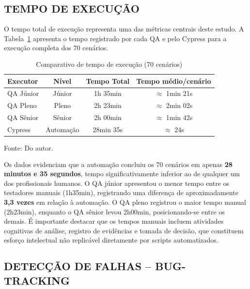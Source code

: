 \documentclass{UNESC}
\begin{document}
\subsection{TEMPO DE EXECUÇÃO}

O tempo total de execução representa uma das métricas centrais deste estudo. A Tabela~\ref{tab:tempo} apresenta o tempo registrado por cada QA e pelo Cypress para a execução completa dos 70 cenários.

\begin{table}[H]
\captionsetup{skip=2pt, singlelinecheck=false, justification=centering}
\caption{Comparativo de tempo de execução (70 cenários)}
\label{tab:tempo}
\renewcommand{\arraystretch}{1.0}
\setlength{\extrarowheight}{4pt}
\setlength{\tabcolsep}{6pt}
\begin{tabularx}{\textwidth}{X c c c}
\hline
\textbf{Executor} & \textbf{Nível} & \textbf{Tempo Total} & \textbf{Tempo médio/cenário} \\
\hline
QA Júnior & Júnior & 1h 35min & $\approx$ 1min 21s \\
QA Pleno  & Pleno  & 2h 23min & $\approx$ 2min 02s \\
QA Sênior & Sênior & 2h 00min & $\approx$ 1min 42s \\
Cypress   & Automação & 28min 35s & $\approx$ 24s \\
\hline
\end{tabularx}
\vspace{2mm}\par
\noindent Fonte: Do autor.
\end{table}

Os dados evidenciam que a automação concluiu os 70 cenários em apenas \textbf{28 minutos e 35 segundos}, tempo significativamente inferior ao de qualquer um dos profissionais humanos. O QA júnior apresentou o menor tempo entre os testadores manuais (1h35min), registrando uma diferença de aproximadamente \textbf{3,3 vezes} em relação à automação. O QA pleno registrou o maior tempo manual (2h23min), enquanto o QA sênior levou 2h00min, posicionando-se entre os demais. É importante destacar que os tempos manuais incluem atividades cognitivas de análise, registro de evidências e tomada de decisão, que constituem esforço intelectual não replicável diretamente por scripts automatizados.

\subsection{DETECÇÃO DE FALHAS -- BUG-TRACKING}
\end{document}
